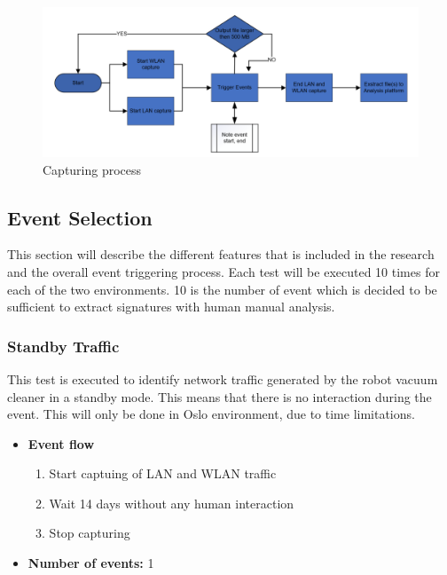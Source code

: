 \begin{figure}[H]
    \centering
    \includegraphics[width=\textwidth]{figures/Event triggering process.png}
    \caption{Capturing process}
    \label{fig:captuingprocess}
\end{figure}

\subsection{Event Selection}
This section will describe the different features that is included in the research and the overall event triggering process. Each test will be executed 10 times for each of the two environments. 10 is the number of event which is decided to be sufficient to extract signatures with human manual analysis.


\subsubsection{Standby Traffic}
This test is executed to identify network traffic generated by the robot vacuum cleaner in a standby mode. This means that there is no interaction during the event. This will only be done in Oslo environment, due to time limitations.

\begin{itemize}
    \item \textbf{Event flow} \begin{enumerate}
                                    \item Start captuing of LAN and WLAN traffic
                                    \item Wait 14 days without any human interaction
                                    \item Stop capturing
                                \end{enumerate}
    \item \textbf{Number of events:} 1
\end{itemize}

